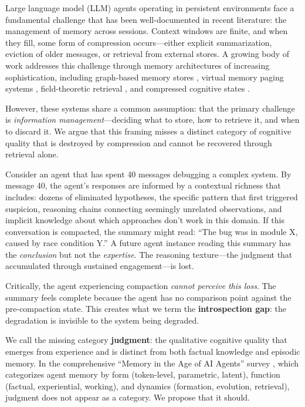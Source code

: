 \documentclass[11pt,a4paper]{article}
\begin{document}
Large language model (LLM) agents operating in persistent environments
face a fundamental challenge that has been well-documented in recent
literature: the management of memory across sessions. Context windows
are finite, and when they fill, some form of compression occurs---either
explicit summarization, eviction of older messages, or retrieval from
external stores. A growing body of work addresses this challenge through
memory architectures of increasing sophistication, including
graph-based memory stores \citep{mem0_2025}, virtual memory paging
systems \citep{packer2023memgpt}, field-theoretic retrieval
\citep{mitra2026field}, and compressed cognitive states
\citep{acc2026}.

However, these systems share a common assumption: that the primary
challenge is \emph{information management}---deciding what to store,
how to retrieve it, and when to discard it. We argue that this framing
misses a distinct category of cognitive quality that is destroyed by
compression and cannot be recovered through retrieval alone.

Consider an agent that has spent 40 messages debugging a complex
system. By message 40, the agent's responses are informed by a
contextual richness that includes: dozens of eliminated hypotheses,
the specific pattern that first triggered suspicion, reasoning chains
connecting seemingly unrelated observations, and implicit knowledge
about which approaches don't work in this domain. If this conversation
is compacted, the summary might read: ``The bug was in module X, caused
by race condition Y.'' A future agent instance reading this summary has
the \emph{conclusion} but not the \emph{expertise}. The reasoning
texture---the judgment that accumulated through sustained
engagement---is lost.

Critically, the agent experiencing compaction \emph{cannot perceive
this loss}. The summary feels complete because the agent has no
comparison point against the pre-compaction state. This creates what
we term the \textbf{introspection gap}: the degradation is invisible
to the system being degraded.

We call the missing category \textbf{judgment}: the qualitative
cognitive quality that emerges from experience and is distinct from
both factual knowledge and episodic memory. In the comprehensive
``Memory in the Age of AI Agents'' survey
\citep{memory_survey_2025}, which categorizes agent memory by form
(token-level, parametric, latent), function (factual, experiential,
working), and dynamics (formation, evolution, retrieval), judgment does
not appear as a category. We propose that it should.
\end{document}
